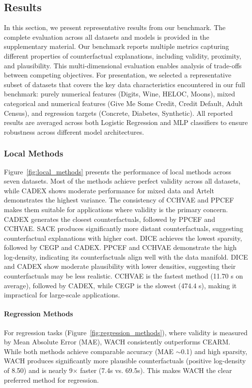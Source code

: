 \documentclass[runningheads]{llncs}
\begin{document}
\subsection{Results}

In this section, we present representative results from our benchmark. The complete evaluation across all datasets and models is provided in the supplementary material. Our benchmark reports multiple metrics capturing different properties of counterfactual explanations, including validity, proximity, and plausibility. This multi-dimensional evaluation enables analysis of trade-offs between competing objectives. For presentation, we selected a representative subset of datasets that covers the key data characteristics encountered in our full benchmark: purely numerical features (Digits, Wine, HELOC, Moons), mixed categorical and numerical features (Give Me Some Credit, Credit Default, Adult Census), and regression targets (Concrete, Diabetes, Synthetic). All reported results are averaged across both Logistic Regression and MLP classifiers to ensure robustness across different model architectures.

\subsubsection{Local Methods}

Figure~\ref{fig:local_methods} presents the performance of local methods across seven datasets. Most of the methods achieve perfect validity across all datasets, while CADEX shows moderate performance for mixed data and Artelt demonstrates the highest variance. The consistency of CCHVAE and PPCEF makes them suitable for applications where validity is the primary concern. CADEX generates the closest counterfactuals, followed by PPCEF and CCHVAE. SACE produces significantly more distant counterfactuals, suggesting counterfactual explanations with higher cost. DICE achieves the lowest sparsity, followed by CEGP and CADEX. PPCEF and CCHVAE demonstrate the high log-density, indicating its counterfactuals align well with the data manifold. DICE and CADEX show moderate plausibility with lower densities, suggesting their counterfactuals may be less realistic. CCHVAE is the fastest method (11.70 s on average), followed by CADEX, while CEGP is the slowest (474.4 s), making it impractical for large-scale applications.

\paragraph{Regression Methods}
For regression tasks (Figure~\ref{fig:regression_methods}), where validity is measured by Mean Absolute Error (MAE), WACH consistently outperforms CEARM. While both methods achieve comparable accuracy (MAE $\sim$0.1) and high sparsity, WACH produces significantly more plausible counterfactuals (positive log-density of 8.50) and is nearly 9$\times$ faster (7.4s vs. 69.5s). This makes WACH the clear preferred method for regression.
\end{document}
